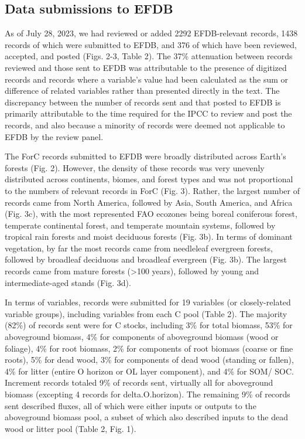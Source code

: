 \documentclass[, manuscript]{copernicus}
\begin{document}
\endgroup{}

\subsection{Data submissions to EFDB}

As of July 28, 2023, we had reviewed or added 2292 EFDB-relevant
records, 1438 records of which were submitted to EFDB, and 376 of which
have been reviewed, accepted, and posted (Figs. 2-3, Table 2). The 37\%
attenuation between records reviewed and those sent to EFDB was
attributable to the presence of digitized records and records where a
variable's value had been calculated as the sum or difference of related
variables rather than presented directly in the text. The discrepancy
between the number of records sent and that posted to EFDB is primarily
attributable to the time required for the IPCC to review and post the
records, and also because a minority of records were deemed not
applicable to EFDB by the review panel.

The ForC records submitted to EFDB were broadly distributed across
Earth's forests (Fig. 2). However, the density of these records was very
unevenly distributed across continents, biomes, and forest types and was
not proportional to the numbers of relevant records in ForC (Fig. 3).
Rather, the largest number of records came from North America, followed
by Asia, South America, and Africa (Fig. 3c), with the most represented
FAO ecozones being boreal coniferous forest, temperate continental
forest, and temperate mountain systems, followed by tropical rain
forests and moist deciduous forests (Fig. 3b). In terms of dominant
vegetation, by far the most records came from needleleaf evergreen
forests, followed by broadleaf deciduous and broadleaf evergreen (Fig.
3b). The largest records came from mature forests (\textgreater100
years), followed by young and intermediate-aged stands (Fig. 3d).

In terms of variables, records were submitted for 19 variables (or
closely-related variable groups), including variables from each C pool
(Table 2). The majority (82\%) of records sent were for C stocks,
including 3\% for total biomass, 53\% for aboveground biomass, 4\% for
components of aboveground biomass (wood or foliage), 4\% for root
biomass, 2\% for components of root biomass (coarse or fine roots), 5\%
for dead wood, 3\% for components of dead wood (standing or fallen), 4\%
for litter (entire O horizon or OL layer component), and 4\% for SOM/
SOC. Increment records totaled 9\% of records sent, virtually all for
aboveground biomass (excepting 4 records for delta.O.horizon). The
remaining 9\% of records sent described fluxes, all of which were either
inputs or outputs to the aboveground biomass pool, a subset of which
also described inputs to the dead wood or litter pool (Table 2, Fig. 1).
\end{document}
